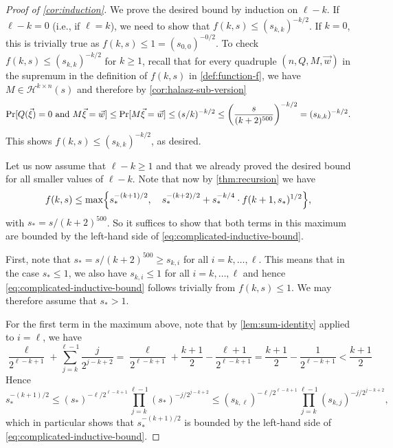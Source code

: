 \documentclass[english]{article}
\theoremstyle{remark}
\numberwithin{equation}{section}
\numberwithin{figure}{section}
\let\originalleft\left
\let\originalright\right
\renewcommand{\left}{\mathopen{}\mathclose\bgroup\originalleft}
\renewcommand{\right}{\aftergroup\egroup\originalright}
\begin{document}
\begin{proof}[Proof of \cref{cor:induction}]
We prove the desired bound by induction on $\ell-k$. If $\ell-k=0$ (i.e., if $\ell=k$), we need to show that $f(k,s)\le (s_{k,k})^{-k/2}$. If $k=0$, this is trivially true as $f(k,s)\le 1=(s_{0,0})^{-0/2}$. To check $f(k,s)\le (s_{k,k})^{-k/2}$ for $k\ge 1$, recall that for every quadruple $(n,Q,M,\vec w)$ in the supremum in the definition of $f(k,s)$ in \cref{def:function-f}, we have $M\in \mathcal{H}^{k\times n}(s)$ and therefore by \cref{cor:halasz-sub-version}
\[\Pr[Q(\vec{\xi})=0\text{ and }M\vec{\xi}=\vec w]\le \Pr[M\vec{\xi}=\vec w]\le (s/k)^{-k/2}\le \left(\frac{s}{(k+2)^{500}}\right)^{-k/2}=(s_{k,k})^{-k/2}.\]
This shows $f(k,s)\le (s_{k,k})^{-k/2}$, as desired.

Let us now assume that $\ell-k\ge 1$ and that we already proved the desired bound for all smaller values of $\ell-k$. Note that now by \cref{thm:recursion} we have
\[f(k,s)\le \max\left\{s_*^{-(k+1)/2}, \quad s_*^{-(k+2)/2}+s_*^{-k/4}\cdot f(k+1,s_*)^{1/2}\right\},\]
with $s_*=s/(k+2)^{500}$. So it suffices to show that both terms in this maximum are bounded by the left-hand side of \cref{eq:complicated-inductive-bound}.

First, note that $s_*=s/(k+2)^{500}\ge s_{k,i}$ for all $i=k,\dots,\ell$. This means that in the case $s_*\le 1$, we also have $s_{k,i}\le 1$ for all $i=k,\dots,\ell$ and hence \cref{eq:complicated-inductive-bound} follows trivially from $f(k,s)\le 1$. We may therefore assume that $s_*> 1$.

For the first term in the maximum above, note that by \cref{lem:sum-identity} applied to $i=\ell$, we have
\[\frac{\ell}{2^{\ell-k+1}}+\sum_{j=k}^{\ell-1}\frac{j}{2^{j-k+2}}=\frac{\ell}{2^{\ell-k+1}}+\frac{k+1}{2}-\frac{\ell+1}{2^{\ell-k+1}}=\frac{k+1}{2}-\frac{1}{2^{\ell-k+1}}<\frac{k+1}{2}\]
Hence
\[s_*^{-(k+1)/2}\le (s_*)^{-\ell/2^{\ell-k+1}}\prod_{j=k}^{\ell-1}(s_*)^{-j/2^{j-k+2}}\le (s_{k,\ell})^{-\ell/2^{\ell-k+1}}\prod_{j=k}^{\ell-1}(s_{k,j})^{-j/2^{j-k+2}},\]
which in particular shows that $s_*^{-(k+1)/2}$ is bounded by the left-hand side of \cref{eq:complicated-inductive-bound}.


\end{proof}
\end{document}
